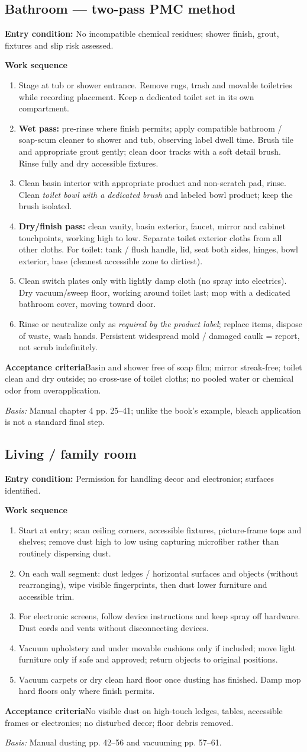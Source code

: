 \documentclass[10pt,letterpaper,oneside]{article}
\newcommand{\subtle}[1]{{\color{graytext}\small #1}}
\newcommand{\sop}[3]{\Needspace{8\baselineskip}\subsection{#1}\subtle{\textbf{Entry condition:} #2}\par\textbf{Work sequence}\begin{enumerate}#3\end{enumerate}}
\newcommand{\accept}[1]{\begin{notebox}\textbf{Acceptance criteria}\quad #1\end{notebox}}
\newcommand{\sources}[1]{\par{\small\color{graytext}\textit{Basis:} #1}\par}
\begin{document}
\sop{Bathroom --- two-pass PMC method}{No incompatible chemical residues; shower finish, grout, fixtures and slip risk assessed.}{
\item Stage at tub or shower entrance. Remove rugs, trash and movable toiletries while recording placement. Keep a dedicated toilet set in its own compartment.
\item \textbf{Wet pass:} pre-rinse where finish permits; apply compatible bathroom / soap-scum cleaner to shower and tub, observing label dwell time. Brush tile and appropriate grout gently; clean door tracks with a soft detail brush. Rinse fully and dry accessible fixtures.
\item Clean basin interior with appropriate product and non-scratch pad, rinse. Clean \emph{toilet bowl with a dedicated brush} and labeled bowl product; keep the brush isolated.
\item \textbf{Dry/finish pass:} clean vanity, basin exterior, faucet, mirror and cabinet touchpoints, working high to low. Separate toilet exterior cloths from all other cloths. For toilet: tank / flush handle, lid, seat both sides, hinges, bowl exterior, base (cleanest accessible zone to dirtiest).
\item Clean switch plates only with lightly damp cloth (no spray into electrics). Dry vacuum/sweep floor, working around toilet last; mop with a dedicated bathroom cover, moving toward door.
\item Rinse or neutralize only as \emph{required by the product label}; replace items, dispose of waste, wash hands. Persistent widespread mold / damaged caulk = report, not scrub indefinitely.}
\accept{Basin and shower free of soap film; mirror streak-free; toilet clean and dry outside; no cross-use of toilet cloths; no pooled water or chemical odor from overapplication.}
\sources{Manual chapter 4 pp. 25--41; unlike the book's example, bleach application is not a standard final step.}

\sop{Living / family room}{Permission for handling decor and electronics; surfaces identified.}{
\item Start at entry; scan ceiling corners, accessible fixtures, picture-frame tops and shelves; remove dust high to low using capturing microfiber rather than routinely dispersing dust.
\item On each wall segment: dust ledges / horizontal surfaces and objects (without rearranging), wipe visible fingerprints, then dust lower furniture and accessible trim.
\item For electronic screens, follow device instructions and keep spray off hardware. Dust cords and vents without disconnecting devices.
\item Vacuum upholstery and under movable cushions only if included; move light furniture only if safe and approved; return objects to original positions.
\item Vacuum carpets or dry clean hard floor once dusting has finished. Damp mop hard floors only where finish permits.}
\accept{No visible dust on high-touch ledges, tables, accessible frames or electronics; no disturbed decor; floor debris removed.}
\sources{Manual dusting pp. 42--56 and vacuuming pp. 57--61.}
\end{document}
